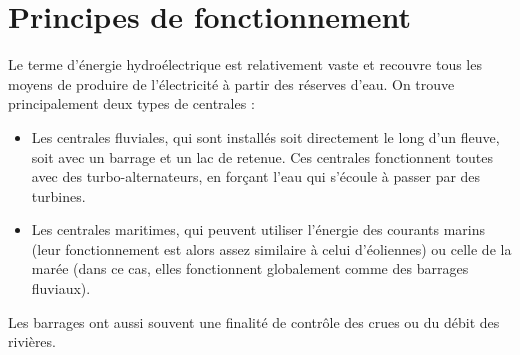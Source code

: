 \documentclass[12pt,a4paper,oneside,openany]{memoir}
\begin{document}
\section{Principes de fonctionnement}
Le terme d'énergie hydroélectrique est relativement vaste et recouvre tous les moyens de produire de l'électricité à partir des réserves d'eau. On trouve principalement deux types de centrales :
\begin{itemize}
	\item Les centrales fluviales, qui sont installés soit directement le long d'un fleuve, soit avec un barrage et un lac de retenue. Ces centrales fonctionnent toutes avec des turbo-alternateurs, en forçant l'eau qui s'écoule à passer par des turbines.
	\item Les centrales maritimes, qui peuvent utiliser l'énergie des courants marins (leur fonctionnement est alors assez similaire à celui d'éoliennes) ou celle de la marée (dans ce cas, elles fonctionnent globalement comme des barrages fluviaux).
\end{itemize}

Les barrages ont aussi souvent une finalité de contrôle des crues ou du débit des rivières.
\end{document}

